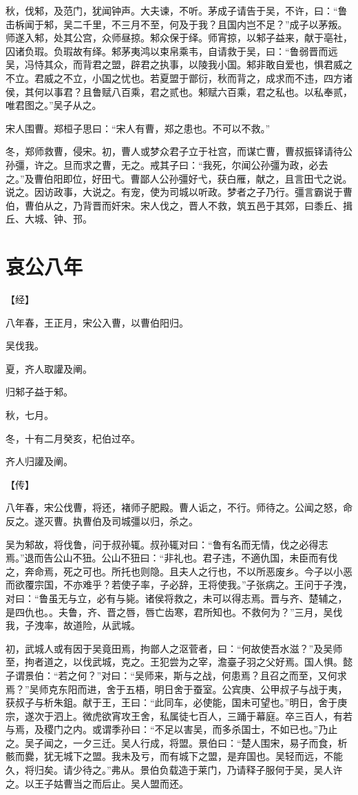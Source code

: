 \documentclass[a4paper,12pt,UTF8,twoside]{ctexbook}
\begin{document}
秋，伐邾，及范门，犹闻钟声。大夫谏，不听。茅成子请告于吴，不许，曰：“鲁击柝闻于邾，吴二千里，不三月不至，何及于我？且国内岂不足？”成子以茅叛。师遂入邾，处其公宫，众师昼掠。邾众保于绎。师宵掠，以邾子益来，献于亳社，囚诸负瑕。负瑕故有绎。邾茅夷鸿以束帛乘韦，自请救于吴，曰：“鲁弱晋而远吴，冯恃其众，而背君之盟，辟君之执事，以陵我小国。邾非敢自爱也，惧君威之不立。君威之不立，小国之忧也。若夏盟于鄫衍，秋而背之，成求而不违，四方诸侯，其何以事君？且鲁赋八百乘，君之贰也。邾赋六百乘，君之私也。以私奉贰，唯君图之。”吴子从之。

宋人围曹。郑桓子思曰：“宋人有曹，郑之患也。不可以不救。”

冬，郑师救曹，侵宋。初，曹人或梦众君子立于社宫，而谋亡曹，曹叔振铎请待公孙彊，许之。旦而求之曹，无之。戒其子曰：“我死，尔闻公孙彊为政，必去之。”及曹伯阳即位，好田弋。曹鄙人公孙彊好弋，获白雁，献之，且言田弋之说。说之。因访政事，大说之。有宠，使为司城以听政。梦者之子乃行。彊言霸说于曹伯，曹伯从之，乃背晋而奸宋。宋人伐之，晋人不救，筑五邑于其郊，曰黍丘、揖丘、大城、钟、邘。


\section{哀公八年}



【经】

八年春，王正月，宋公入曹，以曹伯阳归。

吴伐我。

夏，齐人取讙及阐。

归邾子益于邾。

秋，七月。

冬，十有二月癸亥，杞伯过卒。

齐人归讙及阐。

【传】

八年春，宋公伐曹，将还，褚师子肥殿。曹人诟之，不行。师待之。公闻之怒，命反之。遂灭曹。执曹伯及司城彊以归，杀之。

吴为邾故，将伐鲁，问于叔孙辄。叔孙辄对曰：“鲁有名而无情，伐之必得志焉。”退而告公山不狃。公山不狃曰：“非礼也。君子违，不適仇国，未臣而有伐之，奔命焉，死之可也。所托也则隐。且夫人之行也，不以所恶废乡。今子以小恶而欲覆宗国，不亦难乎？若使子率，子必辞，王将使我。”子张病之。王问于子洩，对曰：“鲁虽无与立，必有与毙。诸侯将救之，未可以得志焉。晋与齐、楚辅之，是四仇也。。夫鲁，齐、晋之唇，唇亡齿寒，君所知也。不救何为？”三月，吴伐我，子洩率，故道险，从武城。

初，武城人或有因于吴竟田焉，拘鄫人之沤菅者，曰：“何故使吾水滋？”及吴师至，拘者道之，以伐武城，克之。王犯尝为之宰，澹臺子羽之父好焉。国人惧。懿子谓景伯：“若之何？”对曰：“吴师来，斯与之战，何患焉？且召之而至，又何求焉？”吴师克东阳而进，舍于五梧，明日舍于蚕室。公宾庚、公甲叔子与战于夷，获叔子与析朱鉏。献于王，王曰：“此同车，必使能，国未可望也。”明日，舍于庚宗，遂次于泗上。微虎欲宵攻王舍，私属徒七百人，三踊于幕庭。卒三百人，有若与焉，及稷门之内。或谓季孙曰：“不足以害吴，而多杀国士，不如已也。”乃止之。吴子闻之，一夕三迁。吴人行成，将盟。景伯曰：“楚人围宋，易子而食，析骸而爨，犹无城下之盟。我未及亏，而有城下之盟，是弃国也。吴轻而远，不能久，将归矣。请少待之。”弗从。景伯负载造于莱门，乃请释子服何于吴，吴人许之。以王子姑曹当之而后止。吴人盟而还。
\end{document}
